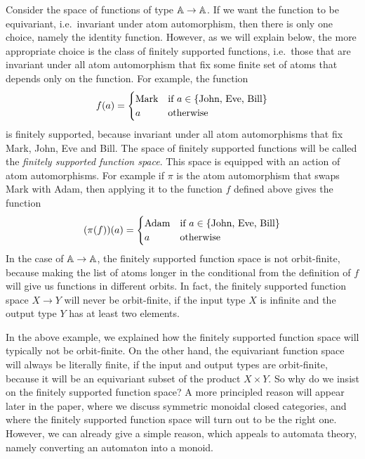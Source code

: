 \begin{example}
    Consider the space of functions of type $\mathbb A \to \mathbb A$. If we want the function to be equivariant, i.e.~invariant under atom automorphism, then there is only one choice, namely the identity function. However, as we will explain below, the more appropriate choice is the class of finitely supported functions, i.e.~those that are invariant under all atom automorphism that fix some finite set of atoms that depends only on the function. For example,  the  function
    \begin{align*}
    f(a) = \begin{cases}
        \text{Mark} & \text{if $a \in \{\text{John, Eve, Bill}\}$} \\
        a & \text{otherwise}
    \end{cases}
    \end{align*}
    is finitely supported, because invariant under all atom automorphisms that fix Mark, John, Eve and Bill. The space of finitely supported functions will be called the \emph{finitely supported function space}. This space is equipped with an action of atom automorphisms. For example if $\pi$ is the atom automorphism that swaps Mark with Adam, then applying it to the function $f$ defined above gives the function
    \begin{align*}
        (\pi(f))(a) = \begin{cases}
            \text{Adam} & \text{if $a \in \{\text{John, Eve, Bill}\}$} \\
            a & \text{otherwise}
        \end{cases}
        \end{align*}
    In the case of $\mathbb A \to \mathbb A$, the finitely supported function space is not orbit-finite, because making the list of atoms longer in the conditional from the definition of $f$ will give us functions in different orbits. In fact, the finitely supported function space $X \to Y$ will never be orbit-finite, if the input type $X$ is infinite and the output type $Y$ has at least two elements. 
\end{example}

In the above example, we explained how the finitely supported function space will typically not be orbit-finite. On the other hand, the equivariant function space will always be literally finite, if the input and output types are orbit-finite, because it will be an equivariant subset of the product $X \times Y$. So why do we insist on the finitely supported function space? A more principled reason will appear later in the paper, where we discuss symmetric monoidal closed categories, and where the finitely supported function space will turn out to be the right one. However, we can already give a simple reason, which appeals to automata theory, namely converting an automaton into a monoid. 


